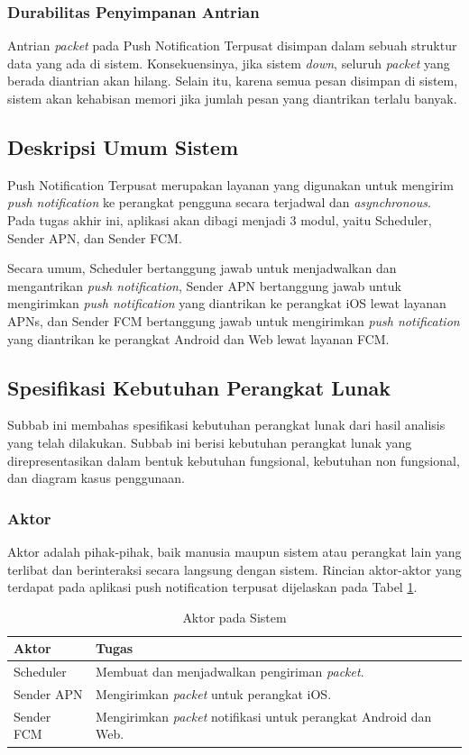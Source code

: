 \subsubsection{Durabilitas Penyimpanan Antrian}
\par Antrian \textit{packet} pada Push Notification Terpusat disimpan dalam sebuah struktur data yang ada di sistem. Konsekuensinya, jika sistem \textit{down}, seluruh \textit{packet} yang berada diantrian akan hilang. Selain itu, karena semua pesan disimpan di sistem, sistem akan kehabisan memori jika jumlah pesan yang diantrikan terlalu banyak.

\subsection{Deskripsi Umum Sistem}
\par Push Notification Terpusat merupakan layanan yang digunakan untuk mengirim \textit{push notification} ke perangkat pengguna secara terjadwal dan \textit{asynchronous}. Pada tugas akhir ini, aplikasi akan dibagi menjadi 3 modul, yaitu Scheduler, Sender APN, dan Sender FCM.
\par Secara umum, Scheduler bertanggung jawab untuk menjadwalkan dan mengantrikan \textit{push notification}, Sender APN bertanggung jawab untuk mengirimkan \textit{push notification} yang diantrikan ke perangkat iOS lewat layanan APNs, dan Sender FCM bertanggung jawab untuk mengirimkan \textit{push notification} yang diantrikan ke perangkat Android dan Web lewat layanan FCM.

\subsection{Spesifikasi Kebutuhan Perangkat Lunak}
\par Subbab ini membahas spesifikasi kebutuhan perangkat lunak dari hasil analisis yang telah dilakukan. Subbab ini berisi kebutuhan perangkat lunak yang direpresentasikan dalam bentuk kebutuhan fungsional, kebutuhan non fungsional, dan diagram kasus penggunaan.

\subsubsection{Aktor}
\par Aktor adalah pihak-pihak, baik manusia maupun sistem atau perangkat lain yang terlibat dan berinteraksi secara langsung dengan sistem. Rincian aktor-aktor yang terdapat pada aplikasi push notification terpusat dijelaskan pada Tabel \ref{t:aktor}.
\begin{longtable}{|p{2cm}|p{7cm}|}
    \caption{Aktor pada Sistem} \label{t:aktor} \\ \hline
    \rowcolor{lightgray} Aktor & Tugas \\ \hline
    Scheduler & Membuat dan menjadwalkan pengiriman \textit{packet}. \\ \hline
    Sender APN & Mengirimkan \textit{packet} untuk perangkat iOS. \\ \hline
    Sender FCM & Mengirimkan \textit{packet} notifikasi untuk perangkat Android dan Web. \\ \hline
\end{longtable}

